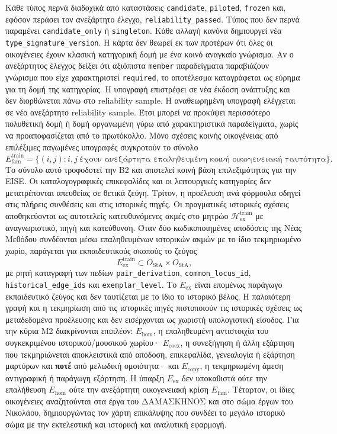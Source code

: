 \documentclass[11pt,a4paper]{article}
\begin{document}
Κάθε τύπος περνά διαδοχικά από καταστάσεις \texttt{candidate}, \texttt{piloted}, \texttt{frozen} και, εφόσον περάσει τον ανεξάρτητο έλεγχο, \texttt{reliability\_passed}. Τύπος που δεν περνά παραμένει \texttt{candidate\_only} ή \texttt{singleton}. Κάθε αλλαγή κανόνα δημιουργεί νέα \texttt{type\_signature\_version}. Η κάρτα δεν θεωρεί εκ των προτέρων ότι όλες οι οικογένειες έχουν κλασική κατηγορική δομή με ένα κοινό αναγκαίο γνώρισμα. Αν ο ανεξάρτητος έλεγχος δείξει ότι αξιόπιστα \texttt{member} παραδείγματα παραβιάζουν γνώρισμα που είχε χαρακτηριστεί \texttt{required}, το αποτέλεσμα καταγράφεται ως εύρημα για τη δομή της κατηγορίας. Η υπογραφή επιστρέφει σε νέα έκδοση ανάπτυξης και δεν διορθώνεται πάνω στο reliability sample. Η αναθεωρημένη υπογραφή ελέγχεται σε νέο ανεξάρτητο reliability sample. Έτσι μπορεί να προκύψει περισσότερο πολυθετική δομή ή δομή οργανωμένη γύρω από χαρακτηριστικά παραδείγματα, χωρίς να προαποφασίζεται από το πρωτόκολλο. Μόνο σχέσεις κοινής οικογένειας από επιλέξιμες παγωμένες υπογραφές συγκροτούν το σύνολο
\[
E_{\mathrm{fam}}^{\mathrm{train}}
=\{(i,j): i,j\ \text{έχουν ανεξάρτητα επαληθευμένη κοινή οικογενειακή ταυτότητα}\}.
\]
Το σύνολο αυτό τροφοδοτεί την B2 και αποτελεί κοινή βάση επιλεξιμότητας για την EISE. Οι καταλογογραφικές επικεφαλίδες και οι λειτουργικές κατηγορίες δεν μετατρέπονται απευθείας σε θετικά ζεύγη. Τρίτον, η προέλευση ανά φόρμουλα οδηγεί στις πλήρεις συνθέσεις και στις ιστορικές πηγές. Οι πραγματικές ιστορικές σχέσεις αποθηκεύονται ως αυτοτελείς κατευθυνόμενες ακμές στο μητρώο $\mathcal H_{\mathrm{ex}}^{\mathrm{train}}$ με αναγνωριστικό, πηγή και κατεύθυνση. Όταν δύο κωδικοποιημένες αποδόσεις της Νέας Μεθόδου συνδέονται μέσω επαληθευμένων ιστορικών ακμών με το ίδιο τεκμηριωμένο χωρίο, παράγεται για εκπαιδευτικούς σκοπούς το ζεύγος
\[
E_{\mathrm{ex}}^{\mathrm{train}}\subset O_{\mathrm{StA}}\times O_{\mathrm{StA}},
\]
με ρητή καταγραφή των πεδίων \texttt{pair\_\allowbreak derivation}, \texttt{common\_\allowbreak locus\_\allowbreak id}, \texttt{historical\_\allowbreak edge\_\allowbreak ids} και \texttt{exemplar\_\allowbreak level}. Το $E_{\mathrm{ex}}$ είναι επομένως παράγωγο εκπαιδευτικό ζεύγος και δεν ταυτίζεται με το ίδιο το ιστορικό βέλος. Η παλαιότερη γραφή και η τεκμηρίωση από τις ιστορικές πηγές πιστοποιούν τις ιστορικές σχέσεις ως μεταδεδομένα προέλευσης και δεν εισέρχονται ως χωριστή υπολογιστική είσοδος. Για την κύρια M2 διακρίνονται επιπλέον: $E_{\mathrm{hom}}$, η επαληθευμένη αντιστοιχία του συγκεκριμένου ιστορικού/μουσικού χωρίου· $E_{\mathrm{coex}}$, η συνεξήγηση ή άλλη εξάρτηση που τεκμηριώνεται αποκλειστικά από απόδοση, επικεφαλίδα, γενεαλογία ή εξάρτηση μαρτύρων και \textbf{ποτέ} από μελωδική ομοιότητα· και $E_{\mathrm{copy}}$, η τεκμηριωμένη άμεση αντιγραφική ή παράγωγη εξάρτηση. Η ύπαρξη $E_{\mathrm{ex}}$ δεν υποκαθιστά ούτε την επαλήθευση $E_{\mathrm{hom}}$ ούτε την ανεξάρτητη οικογενειακή κρίση $E_{\mathrm{fam}}$. Τέταρτον, οι ίδιες οικογένειες αναζητούνται στα έργα του ΔΑΜΑΣΚΗΝΟΣ και στο σώμα έργων του Νικολάου, δημιουργώντας τον χάρτη επικάλυψης που συνδέει το μεγάλο ιστορικό σώμα με την εκτελεστική και ιστορική και αναλυτική εφαρμογή.
\end{document}
